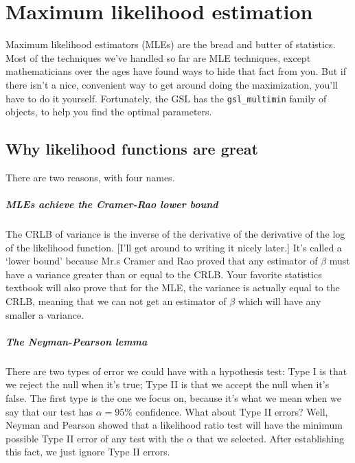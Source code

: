 \chapter{Maximum likelihood estimation} \label{mle}

Maximum likelihood estimators (MLEs) are the bread and butter of
statistics. Most of the techniques we've handled so far are MLE
techniques, except mathematicians over the ages have found ways to hide
that fact from you. But if there isn't a nice, convenient way to get
around doing the maximization, you'll have to do it yourself. Fortunately,
the GSL has the {\tt gsl\_multimin} family of objects, to help you find
the optimal parameters.

\section{Why likelihood functions are great} There are two reasons, with four names.

\paragraph{MLEs achieve the Cramer-Rao lower bound} The CRLB of variance
is the inverse of the derivative of the derivative of the log of the
likelihood function. [I'll get around to writing it nicely later.] It's
called a `lower bound' because Mr.s Cramer and Rao proved that any
estimator of $\beta$ must have a variance greater than or equal to the
CRLB. Your favorite statistics textbook will also prove that for the MLE,
the variance is actually equal to the CRLB, meaning that we can not get
an estimator of $\beta$ which will have any smaller a variance.

\paragraph{The Neyman-Pearson lemma} There are two types of error we could
have with a hypothesis test: Type I is that we reject the null when it's
true; Type II is that we accept the null when it's false. The first type
is the one we focus on, because it's what we mean when we say that our
test has $\alpha=95\%$ confidence. What about Type II errors? Well, Neyman
and Pearson showed that a likelihood ratio test will have the minimum
possible Type II error of any test with the $\alpha$ that we selected. After establishing this fact, we
just ignore Type II errors.

